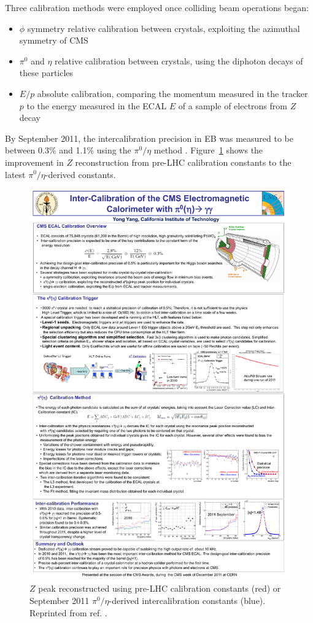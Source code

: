 \documentclass[dissertation.tex]{subfiles}
\begin{document}
Three calibration methods were employed once colliding beam operations began:

\begin{itemize}
\item $\phi$ symmetry relative calibration between crystals, exploiting the azimuthal symmetry of CMS
\item $\pi^{0}$ and $\eta$ relative calibration between crystals, using the diphoton decays of these particles
\item $E/p$ absolute calibration, comparing the momentum measured in the tracker $p$ to the energy measured in the ECAL $E$ of a sample of electrons from $Z$ decay
\end{itemize}
%
By September 2011, the intercalibration precision in EB was measured to be between 0.3\% and 1.1\% using the $\pi^{0}/\eta$ method \cite{Yang}.  Figure~\ref{fig:intercalibration} shows the improvement in $Z$ reconstruction from pre-LHC calibration constants to the latest $\pi^{0}/\eta$-derived constants.

\begin{figure}
	\centering
	\includegraphics[scale=0.5]{intercalibration}
	\caption{$Z$ peak reconstructed using pre-LHC calibration constants (red) or September 2011 $\pi^{0}/\eta$-derived intercalibration constants (blue).  Reprinted from ref. \cite{Yang}.}
	\label{fig:intercalibration}
\end{figure}
\end{document}
